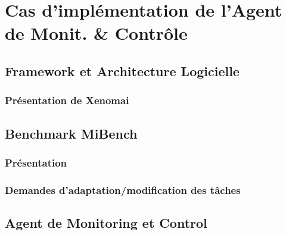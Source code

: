 \documentclass[a4paper,11pt,twoside]{StyleThese}
\begin{document}
\setcounter{chapter}{5} %
\dominitoc
\faketableofcontents
\fi

\chapter{Cas d'implémentation de l'Agent de Monit. \& Contrôle}
\minitoc

    \section{Framework et Architecture Logicielle}
        \subsection{Présentation de Xenomai}
    \section{Benchmark MiBench}
        \subsection{Présentation}
        \subsection{Demandes d'adaptation/modification des tâches}
    \section{Agent de Monitoring et Control}
    
\ifdefined{}
\else


\end{document}
